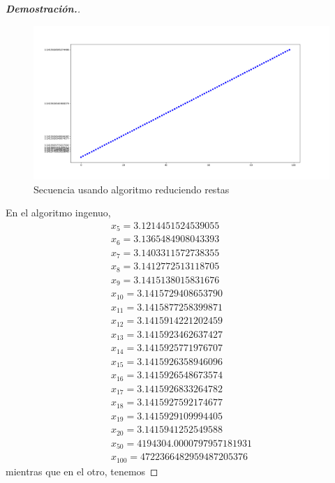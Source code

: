 \documentclass{article}
\begin{document}
\begin{enumerate}
\begin{mdframed}[
			      linecolor=darkgray,
		      ]
\begin{proof}[\textbf{Demostraci\'on.}]
			      \begin{figure}[H]
				      \caption{Secuencia usando algoritmo reduciendo restas}
				      \includegraphics[width=\textwidth]{pi_approx}
			      \end{figure}
			      En el algoritmo ingenuo,
			      \begin{align*}
				      x_5= 3.1214451524539055          \\
				      x_6= 3.1365484908043393          \\
				      x_7= 3.1403311572738355          \\
				      x_8= 3.1412772513118705          \\
				      x_9= 3.1415138015831676          \\
				      x_{10}= 3.1415729408653790       \\
				      x_{11}= 3.1415877258399871       \\
				      x_{12}= 3.1415914221202459       \\
				      x_{13}= 3.1415923462637427       \\
				      x_{14}= 3.1415925771976707       \\
				      x_{15}= 3.1415926358946096       \\
				      x_{16}= 3.1415926548673574       \\
				      x_{17}= 3.1415926833264782       \\
				      x_{18}= 3.1415927592174677       \\
				      x_{19}= 3.1415929109994405       \\
				      x_{20}= 3.1415941252549588       \\
				      x_{50}= 4194304.0000797957181931 \\
				      x_{100} = 4722366482959487205376
			      \end{align*}
			      mientras que en el otro, tenemos

\end{proof}
\end{mdframed}
\end{enumerate}
\end{document}
